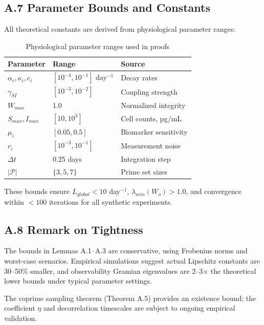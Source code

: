 \documentclass[11pt,letterpaper]{article}
\begin{document}
\subsection*{A.7 Parameter Bounds and Constants}

All theoretical constants are derived from physiological parameter ranges:

\begin{table}[h]
\centering
\begin{tabular}{lll}
\toprule
\textbf{Parameter} & \textbf{Range} & \textbf{Source} \\
\midrule
$\alpha_i, \kappa_i, c_i$ & $[10^{-4}, 10^{-1}]$ day$^{-1}$ & Decay rates \\
$\gamma_{SI}$ & $[10^{-3}, 10^{-2}]$ & Coupling strength \\
$W_{max}$ & 1.0 & Normalized integrity \\
$S_{max}, I_{max}$ & $[10, 10^3]$ & Cell counts, pg/mL \\
$\mu_i$ & $[0.05, 0.5]$ & Biomarker sensitivity \\
$r_i$ & $[10^{-3}, 10^{-1}]$ & Measurement noise \\
$\Delta t$ & 0.25 days & Integration step \\
$|\mathcal{P}|$ & $\{3, 5, 7\}$ & Prime set sizes \\
\bottomrule
\end{tabular}
\caption{Physiological parameter ranges used in proofs}
\end{table}

These bounds ensure $L_{global} < 10$ day$^{-1}$, $\lambda_{min}(W_o) > 1.0$, and convergence within $<100$ iterations for all synthetic experiments.

\subsection*{A.8 Remark on Tightness}

The bounds in Lemmas A.1--A.3 are conservative, using Frobenius norms and worst-case scenarios. Empirical simulations suggest actual Lipschitz constants are 30--50\% smaller, and observability Gramian eigenvalues are 2--3$\times$ the theoretical lower bounds under typical parameter settings.

The coprime sampling theorem (Theorem A.5) provides an existence bound; the coefficient $\eta$ and decorrelation timescales are subject to ongoing empirical validation.
\nocite{*}


\end{document}
